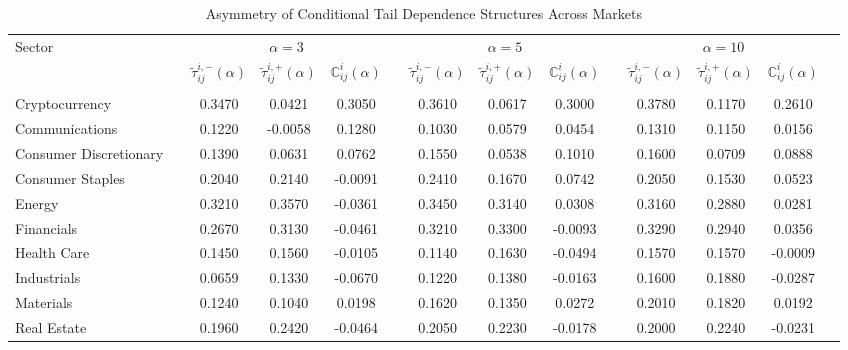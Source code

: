 \documentclass{article}
\begin{document}
\begin{table}[H]\centering
\scriptsize
\caption{Asymmetry of Conditional Tail Dependence Structures Across Markets}\label{tab:pat-1}
\begin{threeparttable}
\begin{tabular}{lccccccccccccc}\toprule
 \multirow{3}{*}{Sector}  & &\multicolumn{3}{c}{$\alpha = 3$} & &\multicolumn{3}{c}{$\alpha = 5$} & &\multicolumn{3}{c}{$\alpha = 10$} \\\cmidrule{3-5}\cmidrule{7-9}\cmidrule{11-13}
 & & $\tilde{\tau}^{i,-}_{ij}(\alpha)$ & $\tilde{\tau}^{i,+}_{ij}(\alpha)$ & $\mathbb{C}^i_{ij}(\alpha)$ & & $\tilde{\tau}^{i,-}_{ij}(\alpha)$ & $\tilde{\tau}^{i,+}_{ij}(\alpha)$ & $\mathbb{C}^i_{ij}(\alpha)$ & & $\tilde{\tau}^{i,-}_{ij}(\alpha)$ & $\tilde{\tau}^{i,+}_{ij}(\alpha)$ & $\mathbb{C}^i_{ij}(\alpha)$   \\\midrule
& & & & & & \\[-2mm]
\multicolumn{1}{l}{Cryptocurrency}     &  & 0.3470 & 0.0421 & 0.3050 & & 0.3610 & 0.0617 & 0.3000 & & 0.3780 & 0.1170 & 0.2610  \\[1.25mm]
\multicolumn{1}{l}{Communications}     &  & 0.1220 & -0.0058 & 0.1280 & & 0.1030 & 0.0579 & 0.0454 & & 0.1310 & 0.1150 & 0.0156 \\
\multicolumn{1}{l}{Consumer Discretionary}     &  & 0.1390 & 0.0631 & 0.0762 & & 0.1550 & 0.0538 & 0.1010 & & 0.1600 & 0.0709 & 0.0888 \\
\multicolumn{1}{l}{Consumer Staples}     &  & 0.2040 & 0.2140 & -0.0091 & & 0.2410 & 0.1670 & 0.0742 & & 0.2050 & 0.1530 & 0.0523 \\
\multicolumn{1}{l}{Energy}     &  & 0.3210 & 0.3570 & -0.0361 & & 0.3450 & 0.3140 & 0.0308 & & 0.3160 & 0.2880 & 0.0281 \\
\multicolumn{1}{l}{Financials}   &  & 0.2670 & 0.3130 & -0.0461 & & 0.3210 & 0.3300 & -0.0093 & & 0.3290 & 0.2940 & 0.0356 \\
\multicolumn{1}{l}{Health Care}   &  & 0.1450 & 0.1560 & -0.0105 & & 0.1140 & 0.1630 & -0.0494 & & 0.1570 & 0.1570 & -0.0009 \\
\multicolumn{1}{l}{Industrials}     &  & 0.0659 & 0.1330 & -0.0670 & & 0.1220 & 0.1380 & -0.0163 & & 0.1600 & 0.1880 & -0.0287 \\
\multicolumn{1}{l}{Materials}     &  & 0.1240 & 0.1040 & 0.0198 & & 0.1620 & 0.1350 & 0.0272 & & 0.2010 & 0.1820 & 0.0192 \\
\multicolumn{1}{l}{Real Estate}     &  & 0.1960 & 0.2420 & -0.0464 & & 0.2050 & 0.2230 & -0.0178 & & 0.2000 & 0.2240 & -0.0231 \\

\end{tabular}
\end{threeparttable}
\end{table}
\end{document}
